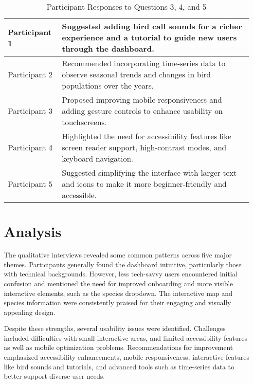 \begin{table}[H]
\begin{tabular}{p{3cm} | p{12cm}}
        \hline
        Participant 1 & Suggested adding bird call sounds for a richer experience and a tutorial to guide new users through the dashboard. \\
        \hline
        Participant 2 & Recommended incorporating time-series data to observe seasonal trends and changes in bird populations over the years. \\
        \hline
        Participant 3 & Proposed improving mobile responsiveness and adding gesture controls to enhance usability on touchscreens. \\
        \hline
        Participant 4 & Highlighted the need for accessibility features like screen reader support, high-contrast modes, and keyboard navigation. \\
        \hline
        Participant 5 & Suggested simplifying the interface with larger text and icons to make it more beginner-friendly and accessible. \\
        \hline
    \end{tabular}
    \caption{Participant Responses to Questions 3, 4, and 5}
    \label{tab:responses2}
\end{table}


\section{Analysis}

The qualitative interviews revealed some common patterns across five major themes. Participants generally found the dashboard intuitive, particularly those with technical backgrounds. However, less tech-savvy users encountered initial confusion and mentioned the need for improved onboarding and more visible interactive elements, such as the species dropdown. The interactive map and species information were consistently praised for their engaging and visually appealing design.

Despite these strengths, several usability issues were identified. Challenges included difficulties with small interactive areas, and limited accessibility features as well as mobile optimization problems. Recommendations for improvement emphasized accessibility enhancements, mobile responsiveness, interactive features like bird sounds and tutorials, and advanced tools such as time-series data to better support diverse user needs.